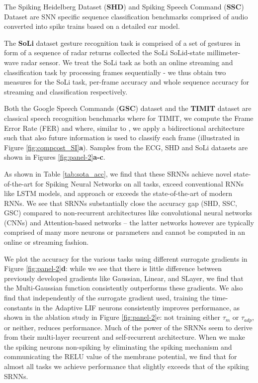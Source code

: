 \documentclass[fleqn,10pt]{wlscirep}
\begin{document}
The Spiking Heidelberg Dataset ({\bf SHD}) and Spiking Speech Command ({\bf SSC}) Dataset \cite{cramer2019heidelberg} are SNN specific sequence classification benchmarks comprised of audio converted into spike trains based on a detailed ear model. 


The {\bf SoLi} dataset\cite{wang2016interacting} gesture recognition task is comprised of a set of gestures in form of a sequence of radar returns collected the SoLi SoLid-state millimeter-wave radar sensor. We treat the SoLi task as both an online streaming and classification task by processing frames sequentially - we thus obtain two measures for the SoLi task, per-frame accuracy and whole sequence accuracy for streaming and classification respectively. 

Both the Google Speech Commands ({\bf GSC}) dataset\cite{warden2018speech} and the {\bf TIMIT} dataset \cite{garofolo1993timit} are classical speech recognition benchmarks where for TIMIT, we compute the Frame Error Rate (FER) and where, similar to \cite{bellec2020solution}, we apply a bidirectional architecture such that also future information is used to classify each frame (illustrated in Figure \ref{fig:compcost_SI}\textbf{a}). Samples from the ECG, SHD and SoLi datasets are shown in Figures \ref{fig:panel-2}\textbf{a-c}. 





 

As shown in Table \ref{tab:sota_acc}, we find that these SRNNs achieve novel state-of-the-art for Spiking Neural Networks on all tasks, exceed conventional RNNs like LSTM models, and approach or exceeds the state-of-the-art of modern RNNs. We see that SRNNs substantially close the accuracy gap (SHD, SSC, GSC) compared to non-recurrent architectures like convolutional neural networks (CNNs) and Attention-based networks -- the latter networks however are typically comprised of many more neurons or parameters and cannot be computed in an online or streaming fashion. 

We plot the accuracy for the various tasks using different surrogate gradients in Figure \ref{fig:panel-2}\textbf{d}: while we see that there is little difference between previously developed gradients like Gaussian, Linear, and SLayer, we find that the Multi-Gaussian function consistently outperforms these gradients. We also find that independently of the surrogate gradient used, training the time-constants in the Adaptive LIF neurons consistently improves performance, as shown in the ablation study in Figure \ref{fig:panel-2}e: not training either $\tau_m$ or $\tau_{adp}$, or neither, reduces performance. Much of the power of the SRNNs seem to derive from their multi-layer recurrent and self-recurrent architecture. When we make the spiking neurons non-spiking by eliminating the spiking mechanism and communicating the RELU value of the membrane potential, we find that for almost all tasks we achieve performance that slightly exceeds that of the spiking SRNNs. 
\end{document}
